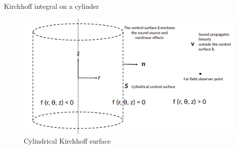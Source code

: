 \documentclass[10pt, aspectratio=169]{beamer}
\begin{document}
\begin{frame}{Kirchhoff integral on a cylinder}
	\begin{figure}
		\centering
		\includegraphics[scale=0.24]{images/cylinder.png}
		\caption{Cylindrical Kirchhoff surface}
	\end{figure}
\end{frame}
\end{document}
